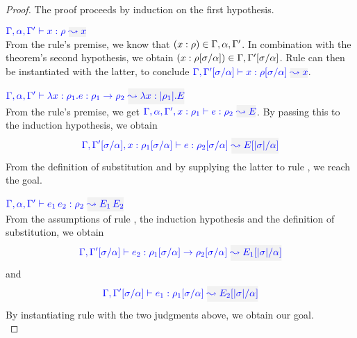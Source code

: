 \begin{proof}
The proof proceeds by induction on the first hypothesis.\\

\item[\fbox{\rref{Ty-Var}}]\quad$\wte{\tenv,\alpha,\tenv'}{x}{\rulet}{x}$\\
From the rule's premise, we know that $(x:\rho) \in \Gamma,\alpha, \Gamma'$.
In combination with the theorem's second hypothesis, we obtain
$(x:\rho[\sigma/\alpha]) \in \Gamma,\Gamma'[\sigma/\alpha]$. Rule  can then be instantiated with the latter, to conclude
$\wte{\tenv,\tenv'[\suty/\alpha]}{x}{\rulet[\suty/\alpha]}{x}$.\\

\item[\fbox{\rref{Ty-Abs}}]\quad$\wte{\tenv,\alpha,\tenv'}{\abs{x}{\rulet_1}{e}}{\rulet_1\to\rulet_2}{\abs{x}{\etrans{\rulet_1}}{E}}$\\
From the rule's premise, we get
$\wte{\tenv,\alpha,\tenv',\relation{x}{\rulet_1}}{e}{\rulet_2}{E}$. By passing this to the
induction hypothesis, we obtain
\begin{equation*}
\wte{\tenv,\tenv'[\suty/\alpha],\relation{x}{\rulet_1[\suty/\alpha]}}{e}{\rulet_2[\suty/\alpha]}{E[\etrans{\suty}/\alpha]}
\end{equation*}
From the definition of substitution and by supplying the latter to rule , we reach
the goal.\\

\item[\fbox{\rref{Ty-App}}]\quad$\wte{\tenv,\alpha,\tenv'}{\mmapp{e_1}{e_2}}{\rulet_2}{\mmapp{E_1}{E_2}}$\\
From the assumptions of rule , the induction hypothesis and the definition of
substitution, we obtain
\begin{equation*}
\wte{\tenv,\tenv'[\suty/\alpha]}{e_2}{\rulet_1[\suty/\alpha]\to\rulet_2[\suty/\alpha]}{E_1[\etrans{\suty}/\alpha]}
\end{equation*}
and
\begin{equation*}
\wte{\tenv,\tenv'[\suty/\alpha]}{e_1}{\rulet_1[\suty/\alpha]}{E_2[\etrans{\suty}/\alpha]}
\end{equation*}
By instantiating rule  with the two judgments above, we obtain our goal.\\


\end{proof}
